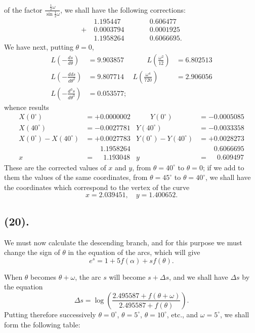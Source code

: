 \documentclass{article}
\begin{document}
of the factor $\frac{\frac{1}{2}\omega}{\sin\frac{1}{2}\omega}$, we shall have the following corrections:
\[ \begin{aligned} & 1.195447 &\qquad& 0.606477\\ +\ & 0.0003794 && 0.0001925\\ & 1.1958264 && 0.6066695. \end{aligned} \]
We have next, putting $\theta=0$,
\[ \begin{aligned} L\left(-\frac{ds}{d\theta}\right)&=9.903857 &\qquad L\left(\frac{\omega^{2}}{12}\right)&=6.802513\\ L\left(-\frac{dds}{d\theta^{2}}\right)&=9.807714 & L\left(\frac{\omega^{4}}{720}\right)&=2.906056\\ L\left(-\frac{d^{3}s}{d\theta^{3}}\right)&=0.053577; \end{aligned} \]
whence results
\[ \begin{aligned} X(0^{\circ})&=+0.0000002 &\qquad Y(0^{\circ})&=-0.0005085\\ X(40^{\circ})&=-0.0027781 & Y(40^{\circ})&=-0.0033358\\ X(0^{\circ})-X(40^{\circ})&=+0.0027783 & Y(0^{\circ})-Y(40^{\circ})&=+0.0028273\\ &\phantom{=+}1.1958264 & &\phantom{=+}0.6066695\\ x&=\phantom{+}1.193048 & y&=\phantom{+}0.609497 \end{aligned} \]
These are the corrected values of $x$ and $y$, from $\theta=40^{\circ}$ to $\theta=0$; if we add to them the values of the same coordinates, from $\theta=45^{\circ}$ to $\theta=40^{\circ}$, we shall have the coordinates which correspond to the vertex of the curve
\[ x=2.039451,\quad y=1.400652. \]

\subsection*{(20).}

We must now calculate the descending branch, and for this purpose we must change the sign of $\theta$ in the equation of the arcs, which will give
\[ e^{s}=1+5f(\alpha)+sf(\theta). \]

When $\theta$ becomes $\theta+\omega$, the arc $s$ will become $s+\Delta s$, and we shall have $\Delta s$ by the equation
\[ \Delta s=\log\left(\frac{2.495587+f(\theta+\omega)}{2.495587+f(\theta)}\right). \]
Putting therefore successively $\theta=0^{\circ}$, $\theta=5^{\circ}$, $\theta=10^{\circ}$, etc., and $\omega=5^{\circ}$, we shall form the following table:
\end{document}
